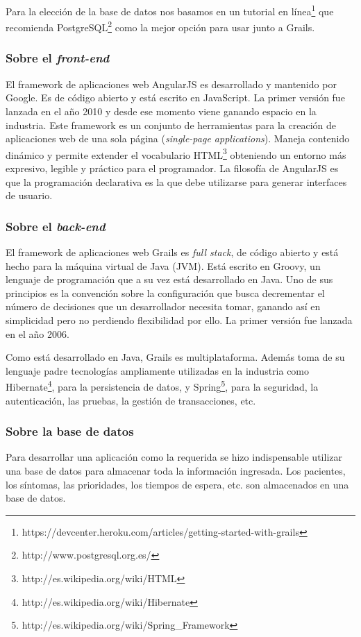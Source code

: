 Para la elección de la base de datos nos basamos en un tutorial en línea\footnote{https://devcenter.heroku.com/articles/getting-started-with-grails} que recomienda PostgreSQL\footnote{http://www.postgresql.org.es/} como la mejor opción para usar junto a Grails.

\subsubsection{Sobre el \textit{front-end}}
El framework de aplicaciones web AngularJS es desarrollado y mantenido por Google. Es de código abierto y está escrito en JavaScript. La primer versión fue lanzada en el año 2010 y desde ese momento viene ganando espacio en la industria. Este framework es un conjunto de herramientas para la creación de aplicaciones web de una sola página (\textit{single-page applications}). Maneja contenido dinámico y permite extender el vocabulario HTML\footnote{http://es.wikipedia.org/wiki/HTML} obteniendo un entorno más expresivo, legible y práctico para el programador. La filosofía de AngularJS es que la programación declarativa es la que debe utilizarse para generar interfaces de usuario.

\subsubsection{Sobre el \textit{back-end}}
El framework de aplicaciones web Grails es \textit{full stack}, de código abierto y está hecho para la máquina virtual de Java (JVM). Está escrito en Groovy, un lenguaje de programación que a su vez está desarrollado en Java. Uno de sus principios es la convención sobre la configuración que busca decrementar el número de decisiones que un desarrollador necesita tomar, ganando así en simplicidad pero no perdiendo flexibilidad por ello. La primer versión fue lanzada en el año 2006.

Como está desarrollado en Java, Grails es multiplataforma. Además toma de su lenguaje padre tecnologías ampliamente utilizadas en la industria como Hibernate\footnote{http://es.wikipedia.org/wiki/Hibernate}, para la persistencia de datos, y Spring\footnote{http://es.wikipedia.org/wiki/Spring\_Framework}, para la seguridad, la autenticación, las pruebas, la gestión de transacciones, etc.

\subsubsection{Sobre la base de datos}
Para desarrollar una aplicación como la requerida se hizo indispensable utilizar una base de datos para almacenar toda la información ingresada. Los pacientes, los síntomas, las prioridades, los tiempos de espera, etc. son almacenados en una base de datos.

